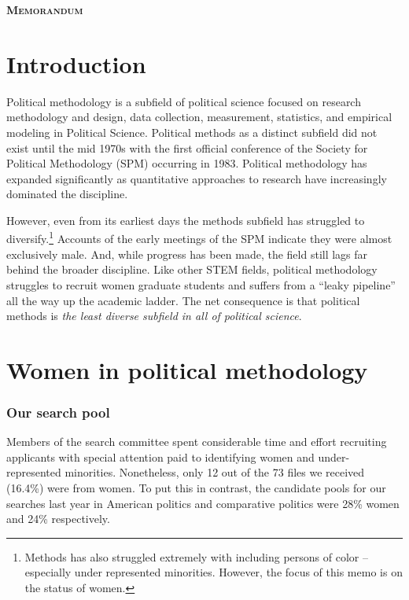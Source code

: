 \documentclass[12pt]{texMemo}
\begin{document}
\newcommand{\stcomp}[1]{{#1}^\complement}

{\begin{center}
\Large\bf
M\textsc{emorandum}
\end{center}}



\maketitle
\singlespacing

\section*{Introduction}

Political methodology is a subfield of political science focused on research methodology and design, data collection,  measurement, statistics, and empirical modeling in Political Science. Political methods as a distinct subfield did not exist until the mid 1970s with the first official conference of the Society for Political Methodology (SPM) occurring in 1983.  Political methodology has expanded significantly as quantitative approaches to research have increasingly dominated the discipline.  

However, even from its earliest days the methods subfield has struggled to diversify.\footnote{Methods has also struggled extremely with including persons of color -- especially under represented minorities.  However, the focus of this memo is on the status of women.}  Accounts of the early meetings of the SPM indicate they were almost exclusively male. And, while progress has been made, the field still lags far behind the broader discipline. Like other STEM fields, political methodology struggles to recruit women graduate students and suffers from a ``leaky pipeline'' all the way up the academic ladder.  The net consequence is that political methods is \textit{the least diverse subfield in all of political science}. 


\section*{Women in political methodology}

\subsubsection*{Our search pool}

Members of the search committee spent considerable time and effort recruiting applicants with special attention paid to identifying women and under-represented minorities.  Nonetheless, only 12 out of the 73 files we received (16.4\%) were from women.  To put this in contrast, the candidate pools for our searches last year in American politics and comparative politics were  28\% women and  24\% respectively. 
\end{document}

